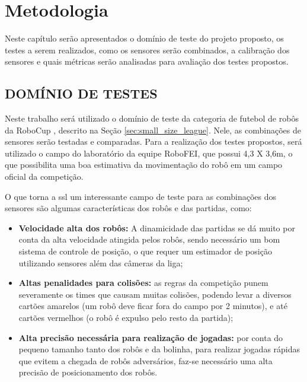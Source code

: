 \documentclass[acronym, symbols, table]{fei}
\begin{document}
\chapter{Metodologia}\label{sec:metodologia}

	Neste capítulo serão apresentados o domínio de teste do projeto proposto, os testes a serem realizados, como os sensores serão combinados, a calibração dos sensores e quais métricas serão analisadas para avaliação dos testes propostos.
	
	\section{DOMÍNIO DE TESTES} \label{sec:dominio_de_testes}
	
		Neste trabalho será utilizado o domínio de teste da categoria  de futebol de robôs da RoboCup \cite{RoboCup}, descrito na Seção \ref{sec:small_size_league}. Nele, as combinações de sensores serão testadas e comparadas. Para a realização dos testes propostos, será utilizado o campo do laboratório da equipe RoboFEI, que possui 4,3 X 3,6m, o que possibilita uma boa estimativa da movimentação do robô em um campo oficial da competição.
		
		O que torna a \acrshort{ssl} um interessante campo de teste para as combinações dos sensores são algumas características dos robôs e das partidas, como:
		
		\begin{itemize}
			\item \textbf{Velocidade alta dos robôs:} A dinamicidade das partidas se dá muito por conta da alta velocidade atingida pelos robôs, sendo necessário um bom sistema de controle de posição, o que requer um estimador de posição utilizando sensores além das câmeras da liga;
			
			\item \textbf{Altas penalidades para colisões:} as regras da competição punem severamente os times que causam muitas colisões, podendo levar a diversos cartões amarelos (um robô deve ficar fora do campo por 2 minutos), e até cartões vermelhos (o robô é expulso pelo resto da partida);
			
			\item \textbf{Alta precisão necessária para realização de jogadas:} por conta do pequeno tamanho tanto dos robôs e da bolinha, para realizar jogadas rápidas que evitem a chegada de robôs adversários, faz-se necessário uma alta precisão de posicionamento dos robôs.
		\end{itemize}
		
\end{document}
